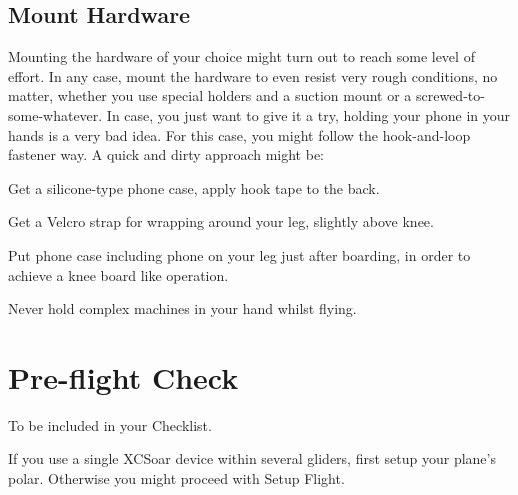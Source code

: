 \documentclass[english,a4paper,12pt]{refrep}
\begin{document}
\subsection{\textcolor{flashblue}{Mount Hardware}}
Mounting the hardware of your choice might turn out to reach some level of 
effort.  In any case, mount the hardware to even resist very rough conditions, 
no matter, whether you use special holders and a suction mount or a 
screwed-to-some-whatever.
In case, you just want to give it a try, holding your phone in your hands is a very 
bad idea. For this case, you might follow the hook-and-loop fastener way. A 
quick and dirty approach might be:
\begin{compactitem}
\item Get a silicone-type phone case, apply hook tape to the back.
\item Get a Velcro strap for wrapping around your leg, slightly above knee.
\item Put phone case including phone on your leg just after boarding, in order 
to achieve a knee board like operation.
\end{compactitem}
Never hold complex machines in your hand whilst flying.

\newpage
\section{Pre-flight Check}


To be included in your Checklist.

If you use a single XCSoar device within several gliders, first setup your
plane's polar. Otherwise you might proceed with Setup Flight.
\end{document}
